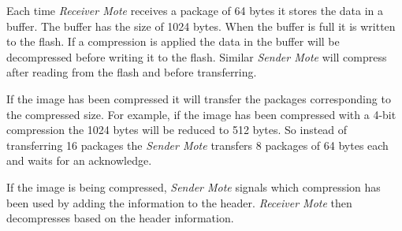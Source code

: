 
Each time \emph{Receiver Mote} receives a package of 64 bytes it stores the data in a buffer. The buffer has the size of 1024 bytes. When the buffer is full it is written to the flash. If a compression is applied the data in the buffer will be decompressed before writing it to the flash. Similar \emph{Sender Mote} will compress after reading from the flash and before transferring.

If the image has been compressed it will transfer the packages corresponding to the compressed size. For example, if the image has been compressed with a 4-bit compression the 1024 bytes will be reduced to 512 bytes. So instead of transferring 16 packages the \emph{Sender Mote} transfers 8 packages of 64 bytes each and waits for an acknowledge.

If the image is being compressed, \emph{Sender Mote} signals which compression has been used by adding the information to the header. \emph{Receiver Mote} then  decompresses based on the header information.